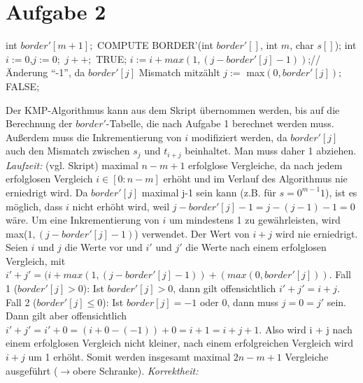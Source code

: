 \documentclass[a4paper,10pt,oneside,leqno]{scrartcl}
\begin{document}
\section*{Aufgabe 2}
\begin{algorithmic}
\State int $border'[m+1];$
\State COMPUTE BORDER'(int $border'[]$, int $m$, char $s[]$);
\State int $i := 0$,$j:=0;$
    \State $j++;$
     \State \Return TRUE;\EndIf
  \EndWhile
  \State $i := i + max(1,(j-border'[j]-1))$;//Änderung ``-1'', da $border'[j]$ Mismatch mitzählt
  \State $j :=$ max$(0, border'[j]);$
\EndWhile
\State \Return FALSE;
\EndFunction
\end{algorithmic}
Der KMP-Algorithmus kann aus dem Skript übernommen werden, bis auf die Berechnung der $border'$-Tabelle, die nach Aufgabe 1 berechnet werden muss.
Außerdem muss die Inkrementierung von $i$ modifiziert werden, da $border'[j]$ auch den Mismatch zwischen $s_j$ und $t_{i+j}$ beinhaltet. Man muss
daher 1 abziehen.\newline\newline
\textit{Laufzeit:} (vgl. Skript) maximal $n-m+1$ erfolglose Vergleiche, da nach jedem erfolglosen Vergleich $i\in [0 : n- m]$ erhöht und
im Verlauf des Algorithmus nie erniedrigt wird. Da $border'[j]$ maximal j-1 sein kann (z.B. für $s=0^{m-1}1$), ist es möglich, dass $i$ nicht erhöht wird,
weil $j-border'[j]-1 = j-(j-1)-1 = 0$ wäre. Um eine Inkrementierung von $i$ um mindestens 1 zu gewährleisten, wird max($1,(j-border'[j]-1)$) verwendet.\newline
Der Wert von $i+j$ wird nie erniedrigt. Seien $i$ und $j$ die Werte vor und $i'$ und $j'$
die Werte nach einem erfolglosen Vergleich, mit $i' + j' = (i + max(1,(j- border'[j]-1)) + (max(0, border'[j]))$.\newline
Fall 1 ($border'[j] > 0$): Ist $border'[j] > 0$, dann gilt offensichtlich $i'+j' = i + j$.\newline
Fall 2 ($border'[j] \leq 0$): Ist $border[j] = -1$ oder 0, dann muss $j = 0 = j'$ sein. Dann gilt
aber offensichtlich $i'+j' = i' + 0 = (i + 0 -(-1)) + 0 = i + 1 = i + j + 1$.\newline
Also wird i + j nach einem erfolglosen Vergleich nicht kleiner, nach einem erfolgreichen Vergleich wird $i + j$ um 1 erhöht.
Somit werden insgesamt maximal $2n- m + 1$ Vergleiche ausgeführt ($\rightarrow$obere Schranke).\newline
\textit{Korrektheit:}
\end{document}
